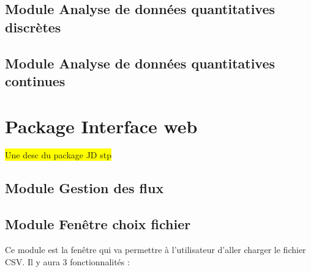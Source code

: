 		\subsection{Module Analyse de données quantitatives discrètes}
			
		\subsection{Module Analyse de données quantitatives continues}
		
		
	\section{Package Interface web}
		\colorbox{yellow}{Une desc du package JD stp}
		
		\subsection{Module Gestion des flux}
		
		\subsection{Module Fenêtre choix fichier}
		Ce module est la fenêtre qui va permettre à l'utilisateur d'aller charger le fichier CSV. Il y aura 3 fonctionnalités :

